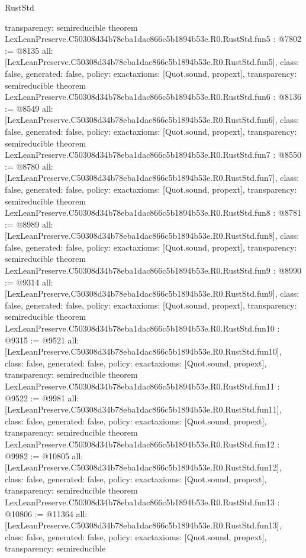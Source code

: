 \begin{lexlean}{RustStd}
\begin{coremodule}
{  transparency: semireducible
}
theorem LexLeanPreserve.C50308d34b78eba1dac866c5b1894b53e.R0.RustStd.fun5 : @7802 := @8135 {
  all: [LexLeanPreserve.C50308d34b78eba1dac866c5b1894b53e.R0.RustStd.fun5],
  class: false,
  generated: false,
  policy: exact{axioms: [Quot.sound, propext]},
  transparency: semireducible
}
theorem LexLeanPreserve.C50308d34b78eba1dac866c5b1894b53e.R0.RustStd.fun6 : @8136 := @8549 {
  all: [LexLeanPreserve.C50308d34b78eba1dac866c5b1894b53e.R0.RustStd.fun6],
  class: false,
  generated: false,
  policy: exact{axioms: [Quot.sound, propext]},
  transparency: semireducible
}
theorem LexLeanPreserve.C50308d34b78eba1dac866c5b1894b53e.R0.RustStd.fun7 : @8550 := @8780 {
  all: [LexLeanPreserve.C50308d34b78eba1dac866c5b1894b53e.R0.RustStd.fun7],
  class: false,
  generated: false,
  policy: exact{axioms: [Quot.sound, propext]},
  transparency: semireducible
}
theorem LexLeanPreserve.C50308d34b78eba1dac866c5b1894b53e.R0.RustStd.fun8 : @8781 := @8989 {
  all: [LexLeanPreserve.C50308d34b78eba1dac866c5b1894b53e.R0.RustStd.fun8],
  class: false,
  generated: false,
  policy: exact{axioms: [Quot.sound, propext]},
  transparency: semireducible
}
theorem LexLeanPreserve.C50308d34b78eba1dac866c5b1894b53e.R0.RustStd.fun9 : @8990 := @9314 {
  all: [LexLeanPreserve.C50308d34b78eba1dac866c5b1894b53e.R0.RustStd.fun9],
  class: false,
  generated: false,
  policy: exact{axioms: [Quot.sound, propext]},
  transparency: semireducible
}
theorem LexLeanPreserve.C50308d34b78eba1dac866c5b1894b53e.R0.RustStd.fun10 : @9315 := @9521 {
  all: [LexLeanPreserve.C50308d34b78eba1dac866c5b1894b53e.R0.RustStd.fun10],
  class: false,
  generated: false,
  policy: exact{axioms: [Quot.sound, propext]},
  transparency: semireducible
}
theorem LexLeanPreserve.C50308d34b78eba1dac866c5b1894b53e.R0.RustStd.fun11 : @9522 := @9981 {
  all: [LexLeanPreserve.C50308d34b78eba1dac866c5b1894b53e.R0.RustStd.fun11],
  class: false,
  generated: false,
  policy: exact{axioms: [Quot.sound, propext]},
  transparency: semireducible
}
theorem LexLeanPreserve.C50308d34b78eba1dac866c5b1894b53e.R0.RustStd.fun12 : @9982 := @10805 {
  all: [LexLeanPreserve.C50308d34b78eba1dac866c5b1894b53e.R0.RustStd.fun12],
  class: false,
  generated: false,
  policy: exact{axioms: [Quot.sound, propext]},
  transparency: semireducible
}
theorem LexLeanPreserve.C50308d34b78eba1dac866c5b1894b53e.R0.RustStd.fun13 : @10806 := @11364 {
  all: [LexLeanPreserve.C50308d34b78eba1dac866c5b1894b53e.R0.RustStd.fun13],
  class: false,
  generated: false,
  policy: exact{axioms: [Quot.sound, propext]},
  transparency: semireducible
}
\end{coremodule}
\end{lexlean}
